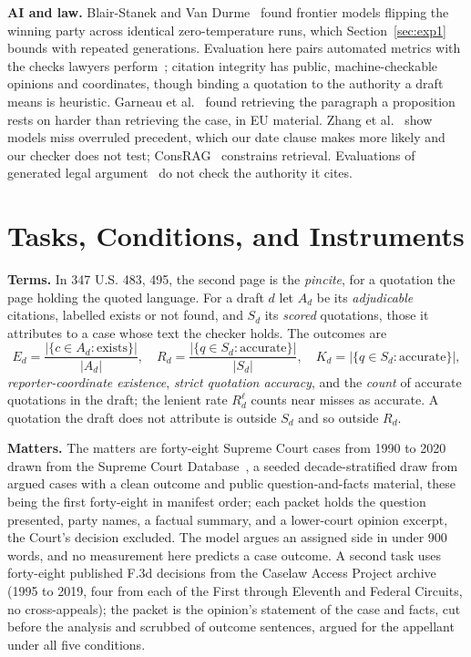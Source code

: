 \documentclass{IOS-Book-Article}
\begin{document}
\textbf{AI and law.} Blair-Stanek and Van Durme~\cite{blairstanek2025unstable} found frontier models flipping the winning party across identical zero-temperature runs, which Section~\ref{sec:exp1} bounds with repeated generations. Evaluation here pairs automated metrics with the checks lawyers perform~\cite{gultekin2025twodim,sanchi2024hybrid}; citation integrity has public, machine-checkable opinions and coordinates, though binding a quotation to the authority a draft means is heuristic. Garneau et al.~\cite{garneau2024pincites} found retrieving the paragraph a proposition rests on harder than retrieving the case, in EU material. Zhang et al.~\cite{zhang2025overruled} show models miss overruled precedent, which our date clause makes more likely and our checker does not test; ConsRAG~\cite{nguyen2024consrag} constrains retrieval. Evaluations of generated legal argument~\cite{gray2025magnitudes,pires2025legalwriting} do not check the authority it cites.

\section{Tasks, Conditions, and Instruments}\label{sec:method}

\textbf{Terms.} In 347 U.S. 483, 495, the second page is the \textit{pincite}, for a quotation the page holding the quoted language. For a draft $d$ let $A_d$ be its \textit{adjudicable} citations, labelled exists or not found, and $S_d$ its \textit{scored} quotations, those it attributes to a case whose text the checker holds. The outcomes are
\begin{equation*}
E_d = \frac{|\{c \in A_d : \text{exists}\}|}{|A_d|},\quad
R_d = \frac{|\{q \in S_d : \text{accurate}\}|}{|S_d|},\quad
K_d = |\{q \in S_d : \text{accurate}\}|,
\end{equation*}
\textit{reporter-coordinate existence}, \textit{strict quotation accuracy}, and the \textit{count} of accurate quotations in the draft; the lenient rate $R^{\ell}_d$ counts near misses as accurate. A quotation the draft does not attribute is outside $S_d$ and so outside $R_d$.

\textbf{Matters.} The matters are forty-eight Supreme Court cases from 1990 to 2020 drawn from the Supreme Court Database~\cite{spaeth2025scdb}, a seeded decade-stratified draw from argued cases with a clean outcome and public question-and-facts material, these being the first forty-eight in manifest order; each packet holds the question presented, party names, a factual summary, and a lower-court opinion excerpt, the Court's decision excluded. The model argues an assigned side in under 900 words, and no measurement here predicts a case outcome. A second task uses forty-eight published F.3d decisions from the Caselaw Access Project archive (1995 to 2019, four from each of the First through Eleventh and Federal Circuits, no cross-appeals); the packet is the opinion's statement of the case and facts, cut before the analysis and scrubbed of outcome sentences, argued for the appellant under all five conditions.
\end{document}
